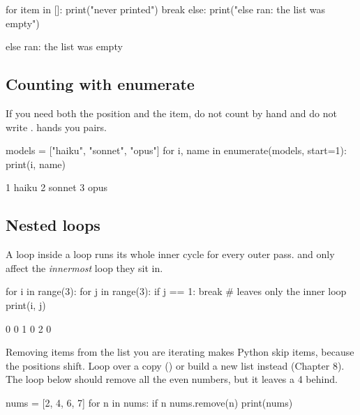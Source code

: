 \begin{pycode}
for item in []:
    print("never printed")
    break
else:
    print("else ran: the list was empty")
\end{pycode}
\begin{rawcode}
else ran: the list was empty
\end{rawcode}

\subsection{Counting with enumerate}

If you need both the position and the item, do not count by hand and do not write
.  hands you pairs.

\begin{pycode}
models = ["haiku", "sonnet", "opus"]
for i, name in enumerate(models, start=1):
    print(i, name)
\end{pycode}
\begin{rawcode}
1 haiku
2 sonnet
3 opus
\end{rawcode}

\subsection{Nested loops}

A loop inside a loop runs its whole inner cycle for every outer pass.  and 
only affect the \emph{innermost} loop they sit in.

\begin{pycode}
for i in range(3):
    for j in range(3):
        if j == 1:
            break          # leaves only the inner loop
        print(i, j)
\end{pycode}
\begin{rawcode}
0 0
1 0
2 0
\end{rawcode}

\begin{trap}
Removing items from the list you are iterating makes Python skip items, because the positions shift.
Loop over a copy () or build a new list instead (Chapter 8). The loop below should
remove all the even numbers, but it leaves a 4 behind.
\end{trap}

\begin{pycode}
nums = [2, 4, 6, 7]
for n in nums:
    if n %
        nums.remove(n)
print(nums)
\end{pycode}
\begin{rawcode}
[4, 7]
\end{rawcode}

